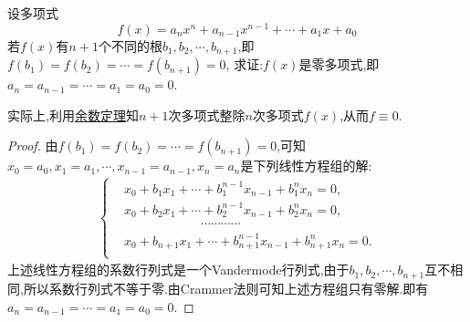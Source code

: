 \documentclass[../../main.tex]{subfiles}%
\begin{document}
\begin{proposition}\label{proposition:多项式根的有限性}
设多项式
\[
f(x)=a_nx^n + a_{n - 1}x^{n - 1}+\cdots+a_1x + a_0
\]
若\(f(x)\)有\(n + 1\)个不同的根\(b_1,b_2,\cdots,b_{n+1}\),即\(f(b_1)=f(b_2)=\cdots=f(b_{n+1})=0\),
求证:\(f(x)\)是零多项式,即\(a_n=a_{n - 1}=\cdots=a_1=a_0 = 0\).
\end{proposition}
\begin{remark}
实际上,利用\hyperref[theorem:余数定理]{余数定理}知$n+1$次多项式整除$n$次多项式$f(x)$,从而$f\equiv 0$.
\end{remark}
\begin{proof}

由\(f(b_1)=f(b_2)=\cdots=f(b_{n+1})=0\),可知$x_0=a_0,x_1=a_1,\cdots ,x_{n-1}=a_{n-1},x_n=a_n$是下列线性方程组的解:
\begin{align*}
\left\{ \begin{aligned}
&x_0+b_1x_1+\cdots +b_{1}^{n-1}x_{n-1}+b_{1}^{n}x_n=0,\\
&x_0+b_2x_1+\cdots +b_{2}^{n-1}x_{n-1}+b_{2}^{n}x_n=0,\\
&\qquad \qquad \qquad \cdots \cdots \cdots \cdots\\
&x_0+b_{n+1}x_1+\cdots +b_{n+1}^{n-1}x_{n-1}+b_{n+1}^{n}x_n=0.\\
\end{aligned} \right. 
\end{align*}
上述线性方程组的系数行列式是一个Vandermode行列式,由于$b_1,b_2,\cdots,b_{n+1}$互不相同,所以系数行列式不等于零.由Crammer法则可知上述方程组只有零解.即有$a_n=a_{n - 1}=\cdots=a_1=a_0 = 0$.

\end{proof}
\end{document}
